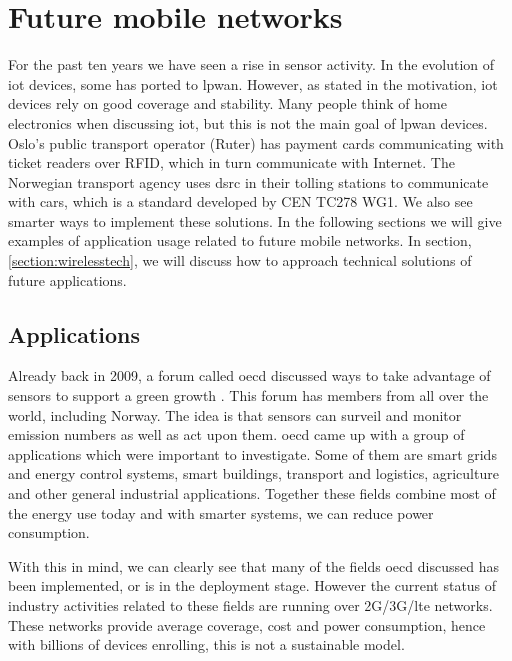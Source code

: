 \documentclass[USenglish]{ifimaster}  %
\begin{document}
\section{Future mobile networks} \label{section:futureapplications}
For the past ten years we have seen a rise in sensor activity. In the evolution of \acrshort{iot} devices, some has ported to \acrshort{lpwan}. However, as stated in the motivation, \acrshort{iot} devices rely on good coverage and stability. Many people think of home electronics when discussing \acrshort{iot}, but this is not the main goal of \acrshort{lpwan} devices. Oslo's public transport operator (Ruter) has payment cards communicating with ticket readers over RFID, which in turn communicate with Internet. The Norwegian transport agency uses \acrfull{dsrc} in their tolling stations to communicate with cars, which is a standard developed by CEN TC278 WG1\cite{EFCCENTC29:online}. We also see smarter ways to implement these solutions. In the following sections we will give examples of application usage related to future mobile networks. In section, \vref{section:wirelesstech}, we will discuss how to approach technical solutions of future applications.

\subsection{Applications} \label{ssection:applications}
Already back in 2009, a forum called \acrfull{oecd} discussed ways to take advantage of sensors to support a green growth \cite{online:industryApplications}. This forum has members from all over the world, including Norway. The idea is that sensors can surveil and monitor emission numbers as well as act upon them. \acrshort{oecd} came up with a group of applications which were important to investigate. Some of them are smart grids and energy control systems, smart buildings, transport and logistics, agriculture and other general industrial applications. Together these fields combine most of the energy use today and with smarter systems, we can reduce power consumption.

With this in mind, we can clearly see that many of the fields \acrshort{oecd} discussed has been implemented, or is in the deployment stage. However the current status of industry activities related to these fields are running over 2G/3G/\acrshort{lte} networks. These networks provide average coverage, cost and power consumption, hence with billions of devices enrolling, this is not a sustainable model.
\end{document}

